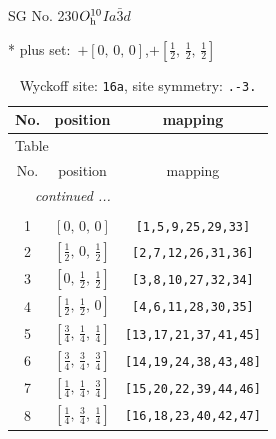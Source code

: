 \documentclass[fleqn,8pt]{jsarticle}
\begin{document}
\setcounter{MaxMatrixCols}{32}

\renewcommand{\tablename}{Table~}
\renewcommand{\figurename}{Figure~}
\begin{center}
\LARGE
SG No. 230\quad$O_{\rm h}^{10}$\quad$Ia\bar{3}d$\quad[ cubic ]
\end{center}
* plus set:\,\,\,$+\left[ 0,\, 0,\, 0 \right]$,\quad $+\left[ \frac{1}{2},\, \frac{1}{2},\, \frac{1}{2} \right]$
\renewcommand{\arraystretch}{1.2}
\begin{longtable}{ccc}
\caption{Wyckoff site: {\tt 16a}, site symmetry: {\tt .-3.}}
 \\
 \hline \hline
No. & position & mapping \\ \hline \endfirsthead

\multicolumn{2}{l}{\tablename\ \thetable{}} \\
 \hline \hline
No. & position & mapping \\ \hline \endhead

 \hline \hline
\multicolumn{2}{r}{\footnotesize\it continued ...} \\ \endfoot

 \hline \hline
\multicolumn{2}{r}{} \\ \endlastfoot

1 & $\left[ 0,\, 0,\, 0 \right]$ & {\tt [1,5,9,25,29,33]} \\ \hline
2 & $\left[ \frac{1}{2},\, 0,\, \frac{1}{2} \right]$ & {\tt [2,7,12,26,31,36]} \\ \hline
3 & $\left[ 0,\, \frac{1}{2},\, \frac{1}{2} \right]$ & {\tt [3,8,10,27,32,34]} \\ \hline
4 & $\left[ \frac{1}{2},\, \frac{1}{2},\, 0 \right]$ & {\tt [4,6,11,28,30,35]} \\ \hline
5 & $\left[ \frac{3}{4},\, \frac{1}{4},\, \frac{1}{4} \right]$ & {\tt [13,17,21,37,41,45]} \\ \hline
6 & $\left[ \frac{3}{4},\, \frac{3}{4},\, \frac{3}{4} \right]$ & {\tt [14,19,24,38,43,48]} \\ \hline
7 & $\left[ \frac{1}{4},\, \frac{1}{4},\, \frac{3}{4} \right]$ & {\tt [15,20,22,39,44,46]} \\ \hline
8 & $\left[ \frac{1}{4},\, \frac{3}{4},\, \frac{1}{4} \right]$ & {\tt [16,18,23,40,42,47]} \\
\end{longtable}
\renewcommand{\arraystretch}{1.2}
\end{document}
